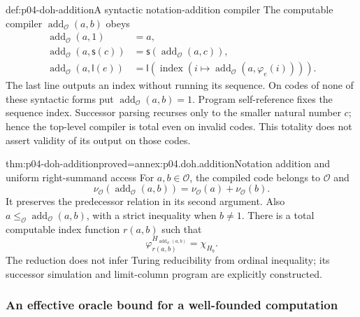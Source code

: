 \begin{hbdefinition}{def:p04-doh-addition}{A syntactic notation-addition compiler}
The computable compiler \(\operatorname{add}_{\mathcal O}(a,b)\) obeys
\[
\begin{aligned}
 \operatorname{add}_{\mathcal O}(a,1)&=a,\\
 \operatorname{add}_{\mathcal O}(a,\mathsf s(c))
   &=\mathsf s(\operatorname{add}_{\mathcal O}(a,c)),\\
 \operatorname{add}_{\mathcal O}(a,\mathsf l(e))
   &=\mathsf l(\operatorname{index}(i\mapsto
          \operatorname{add}_{\mathcal O}(a,\varphi_e(i)))).
\end{aligned}
\]
The last line outputs an index without running its sequence. On codes of
none of these syntactic forms put \(\operatorname{add}_{\mathcal O}(a,b)=1\).
Program self-reference fixes the sequence index. Successor parsing recurses
only to the smaller natural number \(c\); hence the top-level compiler is
total even on invalid codes. This totality does not assert validity of its
output on those codes.
\end{hbdefinition}

\begin{hblemma}{thm:p04-doh-addition}{proved=annex:p04.doh.addition}{Notation addition and uniform right-summand access}
For \(a,b\in\mathcal O\), the compiled code belongs to \(\mathcal O\) and
\[
 \nu_{\mathcal O}(\operatorname{add}_{\mathcal O}(a,b))
     =\nu_{\mathcal O}(a)+\nu_{\mathcal O}(b).
\]
It preserves the predecessor relation in its second argument. Also
\(a\leq_{\mathcal O}\operatorname{add}_{\mathcal O}(a,b)\), with a strict
inequality when \(b\ne1\).
There is a total computable index function \(r(a,b)\) such that
\[
 \varphi_{r(a,b)}^{H_{\operatorname{add}_{\mathcal O}(a,b)}}
       =\chi_{H_b}.
\]
The reduction does not infer Turing reducibility from ordinal inequality;
its successor simulation and limit-column program are explicitly constructed.
\end{hblemma}

\subsubsection{An effective oracle bound for a well-founded computation}

